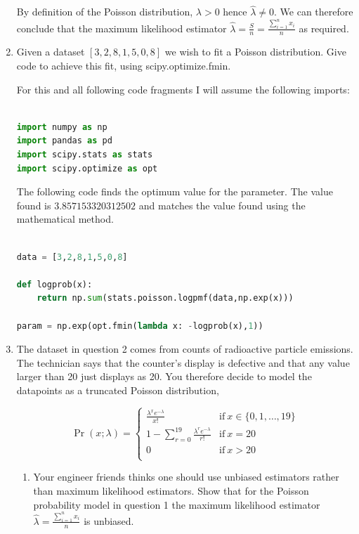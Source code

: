 \documentclass[10pt,\jkfside,a4paper]{article}
\begin{document}
\begin{enumerate}
By definition of the Poisson distribution, $\lambda > 0$ hence
$\hat{\lambda} \neq 0$. We can therefore conclude that the maximum
likelihood estimator $\hat{\lambda} = \frac{S}{n} = \frac{\sum^n_{i=1}x_i}{n}$
as required.

\item Given a dataset $[3, 2, 8, 1, 5, 0, 8]$ we wish to fit a Poisson
distribution. Give code to achieve this fit, using scipy.optimize.fmin.

For this and all following code fragments I will assume the following imports:

\begin{lstlisting}[language=Python]

import numpy as np
import pandas as pd
import scipy.stats as stats
import scipy.optimize as opt

\end{lstlisting}

The following code finds the optimum value for the parameter. The value
found is $3.857153320312502$ and matches the value found using the
mathematical method.

\begin{lstlisting}[language=Python]

data = [3,2,8,1,5,0,8]

def logprob(x):
	return np.sum(stats.poisson.logpmf(data,np.exp(x)))

param = np.exp(opt.fmin(lambda x: -logprob(x),1))

\end{lstlisting}

\item The dataset in question 2 comes from counts of radioactive particle
emissions. The technician says that the counter's display is defective and
that any value larger than 20 just displays as 20. You therefore decide to
model the datapoints as a truncated Poisson distribution,

\[
\Pr(x; \lambda) =
\begin{cases}
\frac{\lambda^x e^{-\lambda}}{x!} & \text{if} \ x \in \{0, 1, \dots, 19\} \\
1 - \sum^{19}_{r=0}\frac{\lambda^r e^{-\lambda}}{r!} & \text{if} \ x = 20 \\
0 & \text{if} \ x > 20 \\
\end{cases}
\]

\begin{enumerate}

\item Your engineer friends thinks one should use unbiased estimators rather
than maximum likelihood estimators. Show that for the Poisson probability
model in question 1 the maximum likelihood estimator $\hat{\lambda} =
\frac{\sum^n_{i=1}x_i}{n}$ is unbiased.


\end{enumerate}
\end{enumerate}
\end{document}
